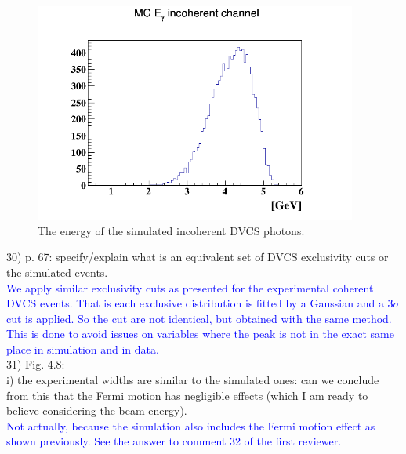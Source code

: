 \begin{figure}[tbp]
\centering
\includegraphics[height=7.2cm]{fig/photon_energy_incoh_sim.png}
\caption{The energy of the simulated incoherent DVCS photons.}
\label{fig:sim_incoh}
 \end{figure}

30) p. 67: specify/explain what is an equivalent set of DVCS exclusivity cuts 
or the simulated events.\\
\textcolor{blue}{ We apply similar exclusivity cuts as presented for the 
experimental coherent DVCS events. That is each exclusive distribution is fitted 
by a Gaussian and a 3$\sigma$ cut is applied. So the cut are not
identical, but obtained with the same method. This is done to avoid issues on 
variables where the peak is not in the exact same place in simulation and in 
data. }\\

31) Fig. 4.8: \\
i) the experimental widths are similar to the simulated ones: can we conclude 
from this that the Fermi motion has negligible effects (which I am ready to 
believe considering the beam energy). \\
 \textcolor{blue}{
   Not actually, because the simulation also includes the Fermi motion effect 
as shown previously. See the answer to comment 32 of the first reviewer.  }\\
  
